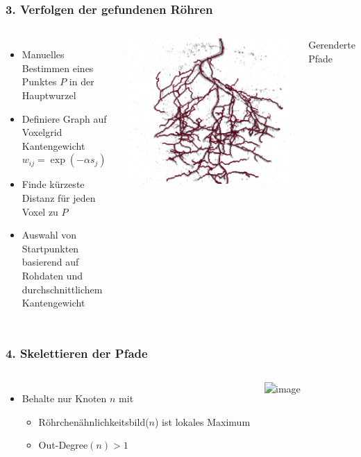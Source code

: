 \documentclass[final,ngerman,ignorenonframetext,compress]{beamer}
\begin{document}
\begin{frame}
	\frametitle{3. Verfolgen der gefundenen R\"ohren}
	\begin{columns}
		\begin{itemize}
			\item Manuelles Bestimmen eines Punktes $P$ in der
				Hauptwurzel
			\item Definiere Graph auf Voxelgrid
				Kantengewicht $w_{ij}=\exp(-\alpha s_j)$
			\item Finde k\"urzeste Distanz f\"ur jeden Voxel zu $P$
			\item Auswahl von Startpunkten basierend auf
				Rohdaten und durchschnittlichem Kantengewicht
		\end{itemize}
		\includegraphics[width=\linewidth]{img2/rendered-paths-4.png}

		\begin{center}
			Gerenderte Pfade
		\end{center}
	\end{columns}
\end{frame}

\begin{frame}
	\frametitle{4. Skelettieren der Pfade}
	\begin{columns}
		\column{.5\linewidth}
		\begin{itemize}
			\item Behalte nur Knoten $n$ mit
				\begin{itemize}
					\item R\"ohrchen\"ahnlichkeitsbild($n$) ist lokales Maximum
					\item Out-Degree$(n)>1$
				\end{itemize}
		\end{itemize}
		\column{.5\linewidth}
		\includegraphics<1>[width=\linewidth]{img2/path-ours-4.png}
	\end{columns}
\end{frame}
\end{document}
